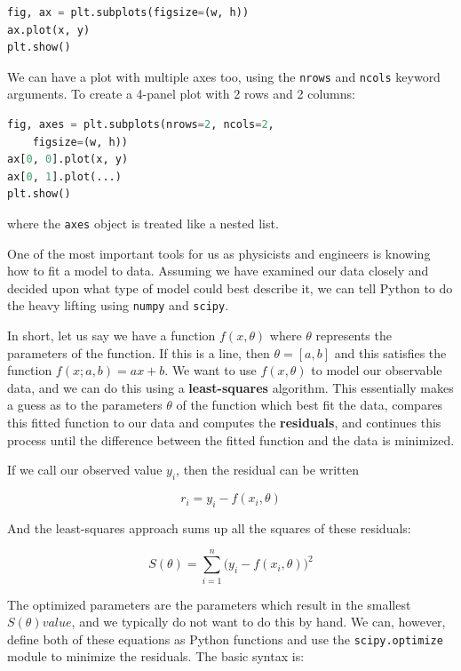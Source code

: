 \documentclass{tufte-book}
\begin{document}
\begin{lstlisting}[language=Python, backgroundcolor=\color{lightgray}]
fig, ax = plt.subplots(figsize=(w, h))
ax.plot(x, y)
plt.show()
\end{lstlisting}

We can have a plot with multiple axes too, using the \verb|nrows| and \verb|ncols| keyword arguments. To create a 4-panel plot with 2 rows and 2 columns:

\begin{lstlisting}[language=Python, backgroundcolor=\color{lightgray}]
fig, axes = plt.subplots(nrows=2, ncols=2, 
    figsize=(w, h))
ax[0, 0].plot(x, y)
ax[0, 1].plot(...)
plt.show()
\end{lstlisting}
\noindent where the \verb|axes| object is treated like a nested list.


One of the most important tools for us as physicists and engineers is knowing how to fit a model to data. Assuming we have examined our data closely and decided upon what type of model could best describe it, we can tell Python to do the heavy lifting using \verb|numpy| and \verb|scipy|. 

In short, let us say we have a function $f(x, \theta)$ where $\theta$ represents the parameters of the function. If this is a line, then $\theta = [a, b]$ and this satisfies the function $f(x; a, b) = ax + b$. We want to use $f(x, \theta)$ to model our observable data, and we can do this using a \textbf{least-squares} algorithm. This essentially makes a guess as to the parameters $\theta$ of the function which best fit the data, compares this fitted function to our data and computes the \textbf{residuals}, and continues this process until the difference between the fitted function and the data is minimized. 

If we call our observed value $y_i$, then the residual can be written

\begin{equation}
    r_i = y_i - f(x_i, \theta)
\end{equation}

And the least-squares approach sums up all the squares of these residuals:

\begin{equation}
    S(\theta) = \sum_{i=1}^n \big(y_i - f(x_i, \theta)\big)^2
\end{equation}

The optimized parameters are the parameters which result in the smallest $S(\theta) value$, and we typically do not want to do this by hand. We can, however, define both of these equations as Python functions and use the \verb|scipy.optimize| module to minimize the residuals. The basic syntax is:
\end{document}
